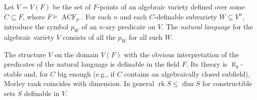 Let $V = V(F)$ be the set of $F$-points of an algebraic variety defined over some $C \subseteq F$, where $F \models \operatorname{ACF}_p$. For each $n$ and each $C$-definable subvariety $W \subseteq V^n$, introduce the symbol $p_W$ of an $n$-ary predicate on $V$. The \textit{natural language} for the algebraic variety $V$ consists of all the $p_W$ for all such $W$.

The structure $V$ on the domain $V(F)$ with the obvious interpretation of the predicates of the natural language is definable in the field $F$. Its theory is $\aleph_0$-stable and, for $C$ big enough (e.g., if $C$ contains an algebraically closed subfield), Morley rank coincides with dimension. In general $\operatorname{rk} S \leq \dim S$ for constructible sets $S$ definable in $V$.
